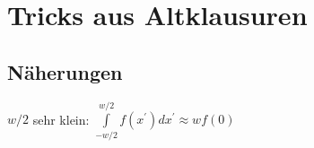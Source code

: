\documentclass[english]{latex4ei/latex4ei_sheet}
\begin{document}
\section{Tricks aus Altklausuren}
\begin{sectionbox}
	\subsection{Näherungen}
	$w/2$ sehr klein: $\int\limits_{-w/2}^{w/2}f(x^{\prime}) d x^{\prime} \approx w f(0)$\\
\end{sectionbox}


\end{document}
